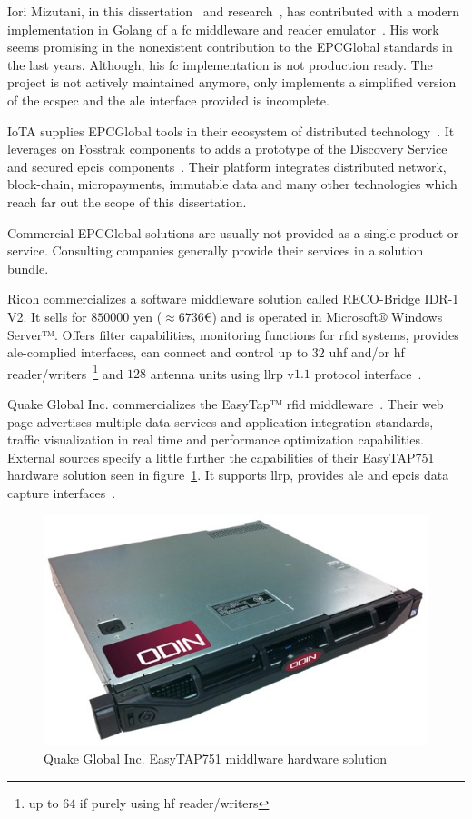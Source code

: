 Iori Mizutani, in this dissertation~\cite{mizutaniRobustHighPerformance} and research~\cite{mizutaniMulticodePortableRFID2016b}, has contributed with a modern implementation in Golang of a \ac{fc} middleware and reader emulator~\cite{mizutaniIomzGolemu2020, mizutaniIomzGosstrak2020}. 
His work seems promising in the nonexistent contribution to the EPCGlobal standards in the last years. Although, his \ac{fc} implementation is not production ready. The project is not actively maintained anymore, only implements a simplified version of the \ac{ecspec} and the \ac{ale} interface provided is incomplete.

IoTA supplies EPCGlobal tools in their ecosystem of distributed technology~\cite{GlobalTradeSupply}. It leverages on Fosstrak components to adds a prototype of the Discovery Service and secured \ac{epcis} components~\cite{FosstrakSimilarProjects}. Their platform integrates distributed network, block-chain, micropayments, immutable data and many other technologies which reach far out the scope of this dissertation.

Commercial EPCGlobal solutions are usually not provided as a single product or service. Consulting companies generally provide their services in a solution bundle.

Ricoh commercializes a software middleware solution called RECO-Bridge IDR-1 V2. It sells for $850000$ yen ($\approx 6736$€) and is operated in Microsoft® Windows Server™. Offers filter capabilities, monitoring functions for \ac{rfid} systems, provides \ac{ale}-complied interfaces, can connect and control up to $32$ \ac{uhf} and/or \ac{hf} reader/writers~\footnote{up to $64$ if purely using \ac{hf} reader/writers} and $128$ antenna units using \ac{llrp} v$1.1$ protocol interface~\cite{RECOBridgeIDR1V2}.

Quake Global Inc. commercializes the EasyTap™ \ac{rfid} middleware~\cite{EasyTAPRealTime}. Their web page advertises multiple data services and application integration standards, traffic visualization in real time and performance optimization capabilities. External sources specify a little further the capabilities of their EasyTAP751 hardware solution seen in figure~\ref{fig:easytap751}. It supports \ac{llrp}, provides \ac{ale} and \ac{epcis} data capture interfaces~\cite{RFIDEasyTAPTag}.

\begin{figure}[H]
    \centering
    \includegraphics[width=0.6\linewidth]{./figs/02-state-of-the-art/easytap751.jpg}
    \caption{Quake Global Inc. EasyTAP751 middlware hardware solution~\cite{RFIDEasyTAPTag}} 
    \label{fig:easytap751}
\end{figure}

